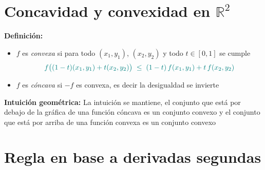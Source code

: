\documentclass{article}
\newcommand{\R}{\ensuremath{\mathbb{R}}}
\begin{document}
\begin{center}
\end{center}


\section*{Concavidad y convexidad en $\R^2$}

\noindent\textbf{Definición:}
\begin{itemize}
  \item \(f\) es \emph{convexa} si para todo \((x_1,y_1)\), \((x_2,y_2)\) y todo \(t\in[0,1]\) se cumple
  \[
    \color{teal}
    f\bigl((1-t)(x_1,y_1)+t(x_2,y_2)\bigr)
    \;\le\;
    (1-t)\,f(x_1,y_1) + t\,f(x_2,y_2)
  \]
  \item \(f\) es \emph{cóncava} si \(-f\) es convexa, es decir la desigualdad se invierte
\end{itemize}

\noindent\textbf{Intuición geométrica:} La intuición se mantiene, el conjunto que está por debajo de la gráfica de una función cóncava es un conjunto convexo y el conjunto que está por arriba de una función convexa es un conjunto convexo

\section*{Regla en base a derivadas segundas}
\end{document}
